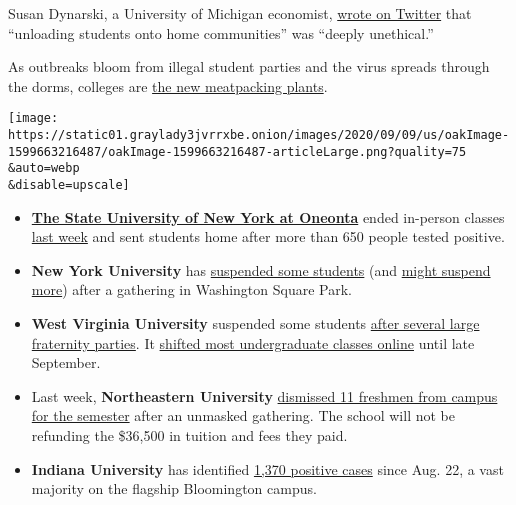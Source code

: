 Susan Dynarski, a University of Michigan economist,
\href{https://twitter.com/dynarski/status/1301950673286836224}{wrote on
Twitter} that ``unloading students onto home communities'' was ``deeply
unethical.''

As outbreaks bloom from illegal student parties and the virus spreads
through the dorms, colleges are
\href{https://www.nytimes3xbfgragh.onion/interactive/2020/05/27/magazine/coronavirus-nebraska-unemployment-jobs.html}{the
new meatpacking plants}.

\texttt{[image: https://static01.graylady3jvrrxbe.onion/images/2020/09/09/us/oakImage-1599663216487/oakImage-1599663216487-articleLarge.png?quality=75\\\&auto=webp\\\&disable=upscale]}

\begin{itemize}
\item
  \textbf{\href{https://www.nytimes3xbfgragh.onion/2020/09/03/nyregion/new-york-suny-oneonta-coronavirus.html}{The
  State University of New York at Oneonta}} ended in-person classes
  \href{https://www.newsday.com/long-island/education/suny-oneonta-coronavirus-1.48911248\#:~:text=SUNY\%20Oneonta\%20is\%20canceling\%20in,because\%20of\%20the\%20coronavirus\%20pandemic.}{last
  week} and sent students home after more than 650 people tested
  positive.
\item
  \textbf{New York University} has
  \href{https://www.nbcnews.com/news/us-news/more-20-nyu-students-suspended-breaking-coronavirus-rules-school-says-n1239443}{suspended
  some students} (and
  \href{https://www.nbcnewyork.com/news/local/nyu-suspends-over-20-students-for-violating-covid-rules/2604047/}{might
  suspend more}) after a gathering in Washington Square Park.
\item
  \textbf{West Virginia University} suspended some students
  \href{https://wvutoday.wvu.edu/stories/2020/09/06/wvu-suspends-29-students-for-covid-19-related-violations-additional-sanctions-pending}{after
  several large fraternity parties}. It
  \href{https://presidentgee.wvu.edu/messages/wvu-temporarily-shifts-most-undergraduate-courses-online-amid-increasing-covid-19-cases}{shifted
  most undergraduate classes online} until late September.
\item
  Last week, \textbf{Northeastern University}
  \href{https://www.boston.com/news/coronavirus/2020/09/04/northeastern-dismisses-students-coronavirus-rules}{dismissed
  11 freshmen from campus for the semester} after an unmasked gathering.
  The school will not be refunding the \$36,500 in tuition and fees they
  paid.
\item
  \textbf{Indiana University} has identified
  \href{https://fall2020.iu.edu/dashboards/}{1,370 positive cases} since
  Aug. 22, a vast majority on the flagship Bloomington campus.
\end{itemize}

